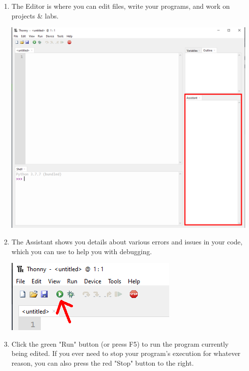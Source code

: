 \documentclass[11pt, letterpaper, onecolumn, oneside, final]{article}
\begin{document}
\begin{enumerate}
\begin{center}
\end{center}
\item The Editor is where you can edit files, write your programs, and work on projects & labs.
\begin{center}
\includegraphics[scale=.3]{thonny_assistant}
\end{center}
\item The Assistant shows you details about various errors and issues in your code, which you can use to help you with debugging. 
\begin{center}
\includegraphics[scale=.7]{thonny_run}
\end{center}
\item Click the green "Run" button (or press F5) to run the program currently being edited. If you ever need to stop your program's execution for whatever reason, you can also press the red "Stop" button to the right. 
\end{enumerate}
\end{document}
